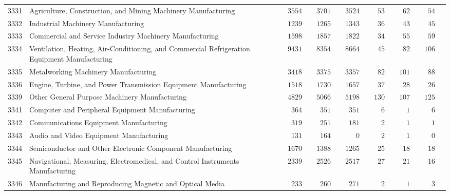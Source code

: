 \documentclass[9pt, oneside]{article}   	%
\begin{document}
\begin{longtable}{lp{3 in}ccccccc}
3331  & Agriculture, Construction, and Mining Machinery Manufacturing & $\phantom{00}3554$ & $\phantom{00}3701$ & $\phantom{00}3524$ & $\phantom{000}53$ & $\phantom{000}62$ & $\phantom{000}54$ \\
3332  & Industrial Machinery Manufacturing & $\phantom{00}1239$ & $\phantom{00}1265$ & $\phantom{00}1343$ & $\phantom{000}36$ & $\phantom{000}43$ & $\phantom{000}45$ \\
3333  & Commercial and Service Industry Machinery Manufacturing & $\phantom{00}1598$ & $\phantom{00}1857$ & $\phantom{00}1822$ & $\phantom{000}34$ & $\phantom{000}55$ & $\phantom{000}59$ \\
3334  & Ventilation, Heating, Air-Conditioning, and Commercial Refrigeration Equipment Manufacturing & $\phantom{00}9431$ & $\phantom{00}8354$ & $\phantom{00}8664$ & $\phantom{000}45$ & $\phantom{000}82$ & $\phantom{00}106$ \\
3335  & Metalworking Machinery Manufacturing & $\phantom{00}3418$ & $\phantom{00}3375$ & $\phantom{00}3357$ & $\phantom{000}82$ & $\phantom{00}101$ & $\phantom{000}88$ \\
3336  & Engine, Turbine, and Power Transmission Equipment Manufacturing & $\phantom{00}1518$ & $\phantom{00}1730$ & $\phantom{00}1657$ & $\phantom{000}37$ & $\phantom{000}28$ & $\phantom{000}26$ \\
3339  & Other General Purpose Machinery Manufacturing & $\phantom{00}4829$ & $\phantom{00}5066$ & $\phantom{00}5198$ & $\phantom{00}130$ & $\phantom{00}107$ & $\phantom{00}125$ \\
3341  & Computer and Peripheral Equipment Manufacturing & $\phantom{000}364$ & $\phantom{000}351$ & $\phantom{000}351$ & $\phantom{0000}6$ & $\phantom{0000}1$ & $\phantom{0000}6$ \\
3342  & Communications Equipment Manufacturing & $\phantom{000}319$ & $\phantom{000}251$ & $\phantom{000}181$ & $\phantom{0000}2$ & $\phantom{0000}1$ & $\phantom{0000}1$ \\
3343  & Audio and Video Equipment Manufacturing & $\phantom{000}131$ & $\phantom{000}164$ & $\phantom{00000}0$ & $\phantom{0000}2$ & $\phantom{0000}1$ & $\phantom{0000}0$ \\
3344  & Semiconductor and Other Electronic Component Manufacturing & $\phantom{00}1670$ & $\phantom{00}1388$ & $\phantom{00}1265$ & $\phantom{000}25$ & $\phantom{000}18$ & $\phantom{000}18$ \\
3345  & Navigational, Measuring, Electromedical, and Control Instruments Manufacturing & $\phantom{00}2339$ & $\phantom{00}2526$ & $\phantom{00}2517$ & $\phantom{000}27$ & $\phantom{000}21$ & $\phantom{000}16$ \\
3346  & Manufacturing and Reproducing Magnetic and Optical Media & $\phantom{000}233$ & $\phantom{000}260$ & $\phantom{000}271$ & $\phantom{0000}2$ & $\phantom{0000}1$ & $\phantom{0000}3$ \\


\end{longtable}
\end{document}
